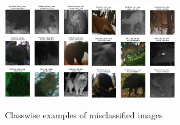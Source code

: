\documentclass[10pt]{article}
\begin{document}
\begin{enumerate}[label=(\alph*)]
\begin{figure}[h!]
            \includegraphics[width=0.325\textwidth]{Assets/Classification/Convnet/Misclassifications/02}
            \includegraphics[width=0.325\textwidth]{Assets/Classification/Convnet/Misclassifications/03}
            \caption{Classwise examples of misclassified images}
            \label{fig:convnet-misclassifications}
        \end{figure}
    \end{enumerate}
\end{document}
